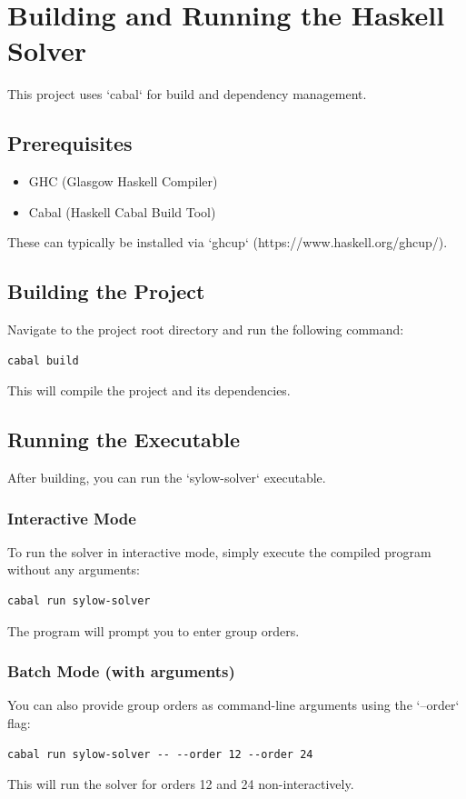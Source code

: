\documentclass[11pt,oneside]{article}
\begin{document}
\section{Building and Running the Haskell Solver}

This project uses `cabal` for build and dependency management.

\subsection{Prerequisites}
\begin{itemize}
    \item GHC (Glasgow Haskell Compiler)
    \item Cabal (Haskell Cabal Build Tool)
\end{itemize}
These can typically be installed via `ghcup` (https://www.haskell.org/ghcup/).

\subsection{Building the Project}
Navigate to the project root directory and run the following command:
\begin{verbatim}
cabal build
\end{verbatim}
This will compile the project and its dependencies.

\subsection{Running the Executable}
After building, you can run the `sylow-solver` executable.

\subsubsection*{Interactive Mode}
To run the solver in interactive mode, simply execute the compiled program without any arguments:
\begin{verbatim}
cabal run sylow-solver
\end{verbatim}
The program will prompt you to enter group orders.

\subsubsection*{Batch Mode (with arguments)}
You can also provide group orders as command-line arguments using the `--order` flag:
\begin{verbatim}
cabal run sylow-solver -- --order 12 --order 24
\end{verbatim}
This will run the solver for orders 12 and 24 non-interactively.
\end{document}
